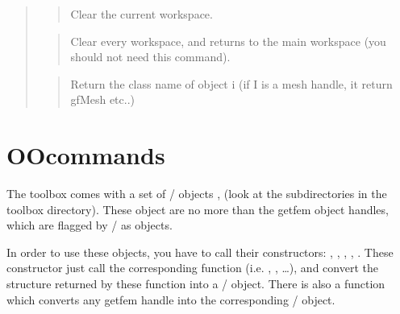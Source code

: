 \documentclass[a4paper,11pt,english]{sphinxmanual}
\begin{document}
\begin{quote}
\sphinxAtStartPar
{}
\begin{quote}

\sphinxAtStartPar
Clear the current workspace.
\end{quote}

\sphinxAtStartPar
{}
\begin{quote}

\sphinxAtStartPar
Clear every workspace, and returns to the main workspace (you
should not need this command).
\end{quote}

\sphinxAtStartPar
{}
\begin{quote}

\sphinxAtStartPar
Return the class name of object i (if I is a mesh handle, it
return gfMesh etc..)
\end{quote}
\end{quote}


\chapter{ OO\sphinxhyphen{}commands}
\label{\detokenize{matlab_octave/oocmd:gfm-oo-commands}}\label{\detokenize{matlab_octave/oocmd:mlab-oocmd}}\label{\detokenize{matlab_octave/oocmd::doc}}
\sphinxAtStartPar
The toolbox comes with a set of  /  objects , (look at the
 sub\sphinxhyphen{}directories in the toolbox directory). These object are no more
than the getfem object handles, which are flagged by  /  as objects.

\sphinxAtStartPar
In order to use these objects, you have to call their constructors: ,
, , , .  These constructor just
call the corresponding  function (i.e.  , , …),
and convert the structure returned by these function into a  /  object. There
is also a  function which converts any getfem handle into the
corresponding  /  object.
\end{document}
